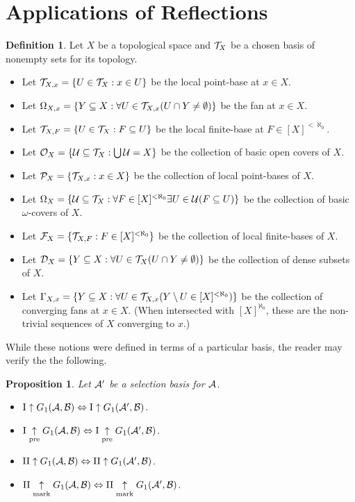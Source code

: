 \documentclass{amsart}
\theoremstyle{plain}
\newtheorem{proposition}[theorem]{Proposition}
\theoremstyle{definition}
\newtheorem{definition}[theorem]{Definition}
\theoremstyle{remark}
\theoremstyle{plain}
\theoremstyle{definition}
\theoremstyle{remark}
\begin{document}
\section{Applications of Reflections}

\begin{definition}\label{selectionSets}
  Let \(X\) be a topological space and \(\mathcal{T}_X\) be a chosen basis of nonempty sets for its topology.
  \begin{itemize}
    \item Let \(\mathcal{T}_{X,x} = \{U\in\mathcal{T}_X : x\in U\}\) be the local point-base at \(x\in X\).
    \item Let \(\Omega_{X,x} = \{Y\subseteq X: \forall U\in\mathcal{T}_{X,x}(U\cap Y\not=\emptyset)\}\) be the fan at \(x\in X\).
    \item Let \(\mathcal{T}_{X,F} = \{U\in\mathcal{T}_X : F\subseteq U\}\) be the local finite-base at \(F\in[X]^{<\aleph_0}\).
    \item Let \(\mathcal{O}_X = \{\mathcal{U}\subseteq\mathcal{T}_X : \bigcup \mathcal{U}=X\}\) be the collection
          of basic open covers of \(X\).
    \item Let \(\mathcal{P}_X = \{\mathcal{T}_{X,x} : x\in X\}\) be the collection of local point-bases of \(X\).
    \item Let \(\Omega_X = \{\mathcal{U}\subseteq\mathcal{T}_X : \forall F\in[X]^{<\aleph_0}\exists U\in\mathcal{U}(F\subseteq U)\}\)
          be the collection of basic \(\omega\)-covers of \(X\).
    \item Let \(\mathcal{F}_X = \{\mathcal{T}_{X,F} : F\in [X]^{<\aleph_0}\}\) be the collection of local finite-bases of \(X\).
    \item Let \(\mathcal{D}_X = \{Y\subseteq X: \forall U\in\mathcal{T}_X(U\cap Y\not=\emptyset)\}\) be the collection of dense subsets of \(X\).
    \item Let \(\Gamma_{X,x} = \{Y\subseteq X: \forall U\in\mathcal{T}_{X,x}(Y\setminus U\in[X]^{<\aleph_0})\}\) be the collection
          of converging fans at \(x\in X\). (When intersected with \([X]^{\aleph_0}\), these are the non-trivial
          sequences of \(X\) converging to \(x\).)
  \end{itemize}
\end{definition}

While these notions were defined in terms of a particular basis, the reader may verify the the following.

\begin{proposition}
  Let \(\mathcal{A}'\) be a selection basis for \(\mathcal{A}\).
  \begin{itemize}
    \item \(\mathrm{I}\uparrow G_{1}(\mathcal{A},\mathcal{B})\Leftrightarrow\mathrm{I}\uparrow G_{1}(\mathcal{A}',\mathcal{B})\).
    \item \(\mathrm{I}\underset{\text{pre}}{\uparrow}G_{1}(\mathcal{A},\mathcal{B})\Leftrightarrow\mathrm{I}\underset{\text{pre}}{\uparrow}G_{1}(\mathcal{A}',\mathcal{B})\).
    \item \(\mathrm{II}\uparrow G_{1}(\mathcal{A},\mathcal{B})\Leftrightarrow\mathrm{II}\uparrow G_{1}(\mathcal{A}',\mathcal{B})\).
    \item \(\mathrm{II}\underset{\text{mark}}{\uparrow}G_{1}(\mathcal{A},\mathcal{B})\Leftrightarrow\mathrm{II}\underset{\text{mark}}{\uparrow}G_{1}(\mathcal{A}',\mathcal{B})\).
  \end{itemize}
\end{proposition}
\end{document}
